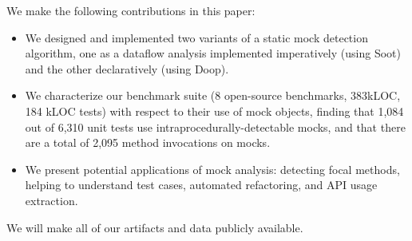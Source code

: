 We make the following contributions in this paper:
\begin{itemize}
	\item We designed and implemented two variants of a static mock detection algorithm, one as a dataflow analysis implemented imperatively (using Soot) and the other declaratively (using Doop).
	\item We characterize our benchmark suite (8 open-source benchmarks, 383kLOC, 184 kLOC tests) with respect to their use of mock objects, finding that 1,084 out of 6,310 unit tests use intraprocedurally-detectable mocks, and that there are a total of 2,095 method invocations on mocks. %
	\item We present potential applications of mock analysis: detecting focal methods, helping to understand test cases, automated refactoring, and API usage extraction.
\end{itemize}

We will make all of our artifacts and data publicly available.

